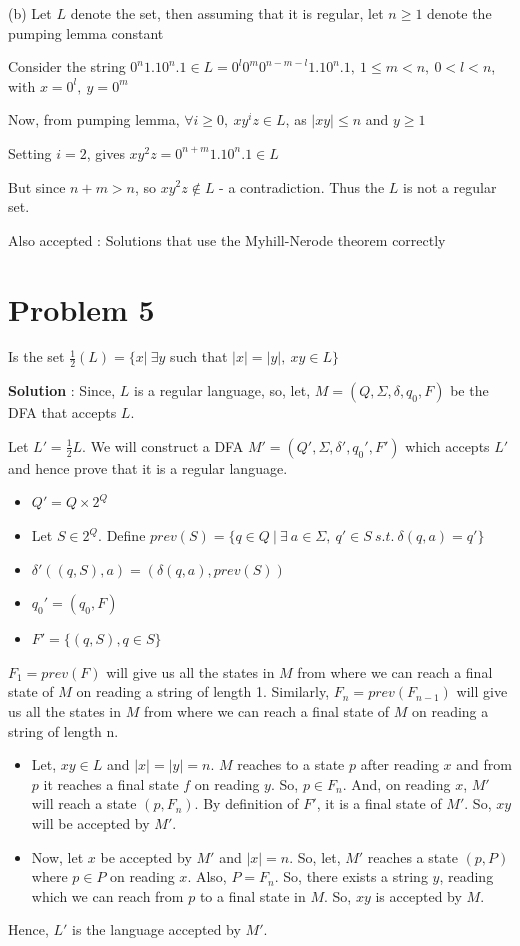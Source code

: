 \documentclass{article}
\begin{document}
    (b) Let $L$ denote the set, then assuming that it is regular, let $n \geq 1$ denote the pumping lemma constant
    
    \quad Consider the string $0^n1.10^n.1 \in L = 0^{l}0^{m}0^{n - m - l}1.10^n.1, ~1 \leq m < n, ~0 < l < n$, with $x = 0^l, ~ y = 0^{m}$
    
    \quad Now, from pumping lemma, $\forall i \geq 0, ~xy^iz \in L$, as $|xy| \leq n$ and $y \geq 1$

     \quad Setting $i = 2$, gives $xy^2z = 0^{n + m}1.10^n.1 \in L$ 
     
     \quad But since $n + m > n$, so $xy^2z \notin L$ - a contradiction. Thus the $L$ is not a regular set.  
     
    Also accepted : Solutions that use the Myhill-Nerode theorem correctly


    \section*{Problem 5} Is the set $\frac{1}{2}(L) = \{ x|~ \exists y$ such that $|x| = |y|, ~xy \in L \}$
    
    \textbf{Solution} : Since, $L$ is a regular language, so, let, $M = (Q,\Sigma, \delta, q_0, F)$ be the DFA that accepts $L$.
    
    Let $L' = \frac{1}{2}L $. We will construct a DFA $M' = (Q',\Sigma, \delta', q_0', F')$ which accepts $L'$ and hence prove that it is a regular language.
    \begin{itemize}
        \item $Q' = Q \times 2^Q $
        \item Let $S\in2^Q$. Define 
         $prev(S)= \{q \in Q\ | \ \exists\ a \in \Sigma,\ q' \in S\ s.t.\ \delta(q,a) = q'\}$
        \item $\delta'((q,S), a) = (\delta(q,a),prev(S))$
        \item $q_0' = (q_0,F)$
        \item $F' = \{(q,S), q\in S\}$
    \end{itemize}
    
    $F_1 = prev(F)$ will give us all the states in $M$ from where we can reach a final state of $M$ on reading a string of length 1. Similarly, $F_n = prev(F_{n-1})$ will give us all the states in $M$ from where we can reach a final state of $M$ on reading a string of length n.
    
    \begin{itemize}
        \item Let, $xy \in L$ and $|x| = |y| = n$. $M$ reaches to a state $p$ after reading $x$ and from $p$ it reaches a final state $f$ on reading $y$. So, $p \in F_n$. And, on reading $x$, $M'$ will reach a state $(p, F_n)$. By definition of $F'$, it is a final state of $M'$. So, $xy$ will be accepted by $M'$.
        \item Now, let $x$ be accepted by $M'$ and $|x| = n$. So, let, $M'$ reaches a state $(p, P)$ where $p \in P$ on reading $x$. Also, $P = F_n$. So, there exists a string $y$, reading which we can reach from $p$ to a final state in $M$. So, $xy$ is accepted by $M$.
    \end{itemize}
    Hence, $L'$ is the language accepted by $M'$.
    
\end{document}
